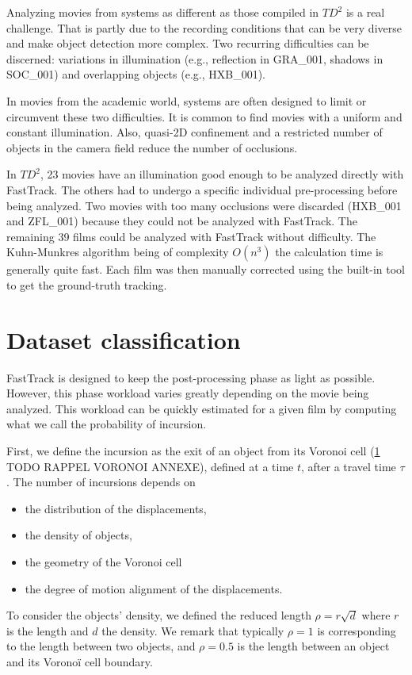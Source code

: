     Analyzing movies from systems as different as those compiled in $TD^2$ is a real challenge. That is partly due to the recording conditions that can be very diverse and make object detection more complex. Two recurring difficulties can be discerned: variations in illumination (e.g., reflection in GRA\_001, shadows in SOC\_001) and overlapping objects (e.g., HXB\_001).

    In movies from the academic world, systems are often designed to limit or circumvent these two difficulties. It is common to find movies with a uniform and constant illumination. Also, quasi-2D confinement and a restricted number of objects in the camera field reduce the number of occlusions.

    In $TD^2$, 23 movies have an illumination good enough to be analyzed directly with FastTrack. The others had to undergo a specific individual pre-processing before being analyzed. Two movies with too many occlusions were discarded (HXB\_001 and ZFL\_001) because they could not be analyzed with FastTrack.
    The remaining 39 films could be analyzed with FastTrack without difficulty. The Kuhn-Munkres algorithm being of complexity $O(n^3)$ the calculation time is generally quite fast. Each film was then manually corrected using the built-in tool to get the ground-truth tracking.

	\section{Dataset classification}
    FastTrack is designed to keep the post-processing phase as light as possible. However, this phase workload varies greatly depending on the movie being analyzed. This workload can be quickly estimated for a given film by computing what we call the probability of incursion.

    First, we define the incursion as the exit of an object from its Voronoi cell (\ref{} TODO RAPPEL VORONOI ANNEXE), defined at a time $t$, after a travel time $\tau$. The number of incursions depends on
    \begin{itemize}
    \item the distribution of the displacements,
    \item the density of objects,
    \item the geometry of the Voronoi cell
    \item the degree of motion alignment of the displacements.
    \end{itemize}
    To consider the objects' density, we defined the reduced length $\rho=r\sqrt{d}$ where $r$ is the length and $d$ the density. We remark that typically $\rho=1$ is corresponding to the length between two objects, and $\rho=0.5$ is the length between an object and its Voronoï cell boundary.

